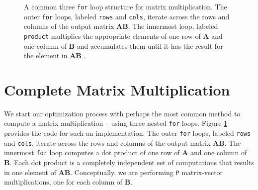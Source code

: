 \begin{figure}

\caption{A common three \lstinline{for} loop structure for matrix multiplication. The outer \lstinline{for} loops, labeled \lstinline{rows} and \lstinline{cols}, iterate across the rows and columns of the output matrix $\mathbf{AB}$.  The innermost loop, labeled \lstinline{product} multiplies the appropriate elements of one row of $\mathbf{A}$ and one column of $\mathbf{B}$ and accumulates them until it has the result for the element in $\mathbf{AB}$ .  }
\label{fig:matrixmultiplication_sw}
\end{figure}

\section{Complete Matrix Multiplication}

We start our optimization process with perhaps the most common method to compute a matrix multiplication -- using three nested \lstinline{for} loops. Figure \ref{fig:matrixmultiplication_sw} provides the code for such an implementation.  The outer \lstinline{for} loops, labeled \lstinline{rows} and \lstinline{cols}, iterate across the rows and columns of the output matrix $\mathbf{AB}$. The innermost \lstinline{for} loop computes a dot product of one row of $\mathbf{A}$ and one column of $\mathbf{B}$. Each dot product is a completely independent set of computations that results in one element of $\mathbf{AB}$.  Conceptually, we are performing \lstinline{P} matrix-vector multiplications, one for each column of $\mathbf{B}$.

